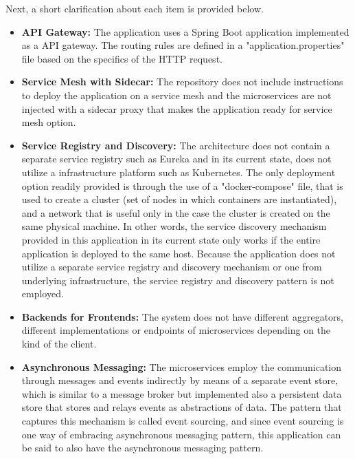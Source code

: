 \documentclass{Configuration_Files/PoliMi3i_thesis}
\begin{document}
Next, a short clarification about each item is provided below.

\begin{itemize}
    \item \textbf{API Gateway:} The application uses a Spring Boot application implemented as a API gateway.
    The routing rules are defined in a "application.properties" file based on the specifics of the HTTP request.
    
    \item \textbf{Service Mesh with Sidecar:} The repository does not include instructions to deploy the application on a service mesh and the microservices are not injected with a sidecar proxy that makes the application ready for service mesh option.
    
    \item \textbf{Service Registry and Discovery:} The architecture does not contain a separate service registry such as Eureka and in its current state, does not utilize a infrastructure platform such as Kubernetes.
    The only deployment option readily provided is through the use of a "docker-compose" file, that is used to create a cluster (set of nodes in which containers are instantiated), and a network that is useful only in the case the cluster is created on the same physical machine.
    In other words, the service discovery mechanism provided in this application in its current state only works if the entire application is deployed to the same host.
    Because the application does not utilize a separate service registry and discovery mechanism or one from underlying infrastructure, the service registry and discovery pattern is not employed.
    
    \item \textbf{Backends for Frontends:} The system does not have different aggregators, different implementations or endpoints of microservices depending on the kind of the client.
    
    \item \textbf{Asynchronous Messaging:} The microservices employ the communication through messages and events indirectly by means of a separate event store, which is similar to a message broker but implemented also a persistent data store that stores and relays events as abstractions of data.
    The pattern that captures this mechanism is called event sourcing, and since event sourcing is one way of embracing asynchronous messaging pattern, this application can be said to also have the asynchronous messaging pattern.
    

\end{itemize}
\end{document}
